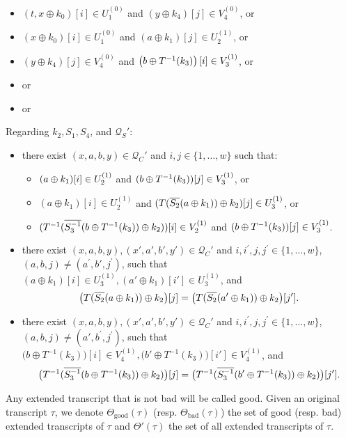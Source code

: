 \begin{definition}
\begin{itemize}[leftmargin=10mm]
\begin{itemize}
			\item $\left(t,x \oplus k_{0}\right)[i]\in U_1^{(0)}$ and $\left(y \oplus k_{4}\right)[j]\in V_4^{(0)}$, or
			\item $\left(x \oplus k_{0}\right)[i]\in U_1^{(0)}$ and $\left(a\oplus k_{1}\right)[j]\in U_2^{(1)}$, or
			\item $\left(y \oplus k_{4}\right)[j]\in V_4^{(0)}$ and $\left(b\oplus T^{-1}(k_3)\right) [i]\in V_3^{(1)}$, or
			\item or
			\item or
		\end{itemize}
	\end{itemize}
	Regarding $k_2,S_1,S_4$, and $\mathcal{Q}_S'$:
	\begin{itemize}[leftmargin=10mm]
		\item[\cfour] there exist $(x,a,b,y) \in \mathcal{Q}_{C}'$ and $i, j \in\{1, \ldots, w\}$ such that:
		\begin{itemize}
			\item $(a\oplus k_1)[i]\in U_2^{(1)}$ and $(b\oplus T^{-1}(k_3))[j]\in V_3^{(1)}$, or
			\item $(a \oplus k_1)[i]\in U_{2}^{(1)}$ and $(T(\overline{S_2}(a \oplus k_1))\oplus k_2)[j]\in U_{3}^{(1)}$, or
			\item $(T^{-1}(\overline{S_3^{-1}}(b\oplus T^{-1}(k_3))\oplus k_2))[i]\in V_2^{(1)}$ and $(b\oplus T^{-1}(k_3))[j]\in V_{3}^{(1)}$.
		\end{itemize}
		\item[\cfive] there exist $(x,a,b,y),(x',a',b',y') \in \mathcal{Q}_{C}'$ and $i, i^{\prime},j, j^{\prime} \in\{1, \ldots, w\}$, $(a,b, j) \neq \left(a^{\prime}, b',j^{\prime}\right)$, such that $(a \oplus k_1)[i]\in U_3^{(1)}, (a' \oplus k_1)[i']\in U_3^{(1)}$, and
		$$\big(T(\overline{S_2}(a\oplus k_1))\oplus k_2\big)[j]=\big(T(\overline{S_2}(a'\oplus k_1))\oplus k_2\big)[j'].
		$$
		\item[\csix] there exist $(x,a,b,y),(x',a',b',y') \in \mathcal{Q}_{C}'$ and $i, i^{\prime}, j, j^{\prime} \in\{1, \ldots, w\}$, $(a,b, j) \neq \left(a',b^{\prime}, j^{\prime}\right)$, such that $\big(b \oplus T^{-1}(k_3)\big)[i]\in V_4^{(1)}, \big(b' \oplus T^{-1}(k_3)\big)[i']\in V_4^{(1)}$, and
		$$\big(T^{-1}(\overline{S_3^{-1}}(b \oplus T^{-1}(k_3))\oplus k_2)\big)[j]=\big(T^{-1}(\overline{S_3^{-1}}(b' \oplus T^{-1}(k_3))\oplus k_2)\big)[j'].
		$$
	\end{itemize}
	Any extended transcript that is not bad will be called good. Given an original transcript $\tau$, we denote $\Theta_{\mathrm{good}}(\tau)$ (resp. $\Theta_{\mathrm{bad}}(\tau)$) the set of good (resp. bad) extended transcripts of $\tau$ and $\Theta'(\tau)$ the set of all extended transcripts of $\tau$.

\end{definition}
